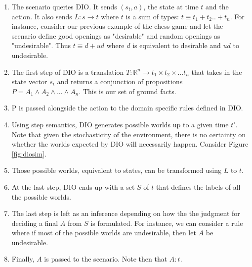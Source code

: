 \begin{enumerate}
  \item The scenario queries DIO. It sends $(s_t, a)$, the state at time $t$ and the action. It also sends $L : s \rightarrow t$ where $t$ is a sum of types: 
        $t \equiv t_1 + t_2 .. + t_n$. For instance, consider our previous example of the chess game and let the scenario define good openings as "desirable" and random openings as 
        "undesirable". Thus $t \equiv d + ud$ where $d$ is equivalent to desirable and $ud$ to undesirable. 
  \item The first step of DIO is a translation $T : \mathbb{R}^n
  \rightarrow t_1 \times t_2 \times ... t_n$ that takes in the state
  vector $s_t$ and returns a conjunction of propositions $P = A_1 \wedge
  A_2 \wedge ... \wedge A_n$. This is our set of ground facts.
  \item P is passed alongside the action to the domain specific rules defined in DIO. 
  \item Using step semantics, DIO generates possible worlds up to a given time $t'$. Note that given the stochasticity of the environment, there is no certainty on
        whether the worlds expected by DIO will necessarily happen. Consider Figure \ref{fig:diosim}.
  \item Those possible worlds, equivalent to states, can be
  transformed using $L$ to $t$.
  \item At the last step, DIO ends up with a set $S$ of $t$ that defines the labels of all the possible worlds.
  \item The last step is left as an inference depending on how the the judgment for deciding a final $A$ from $S$ 
        is formulated. For instance, we can consider a rule where if most of the possible worlds are undesirable, then let $A$ be undesirable.
  \item Finally, $A$ is passed to the scenario. Note then that $A : t$. 
\end{enumerate}

